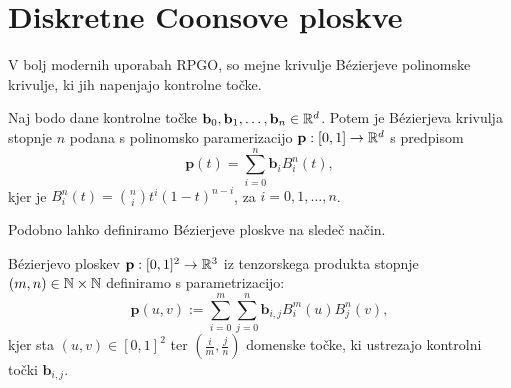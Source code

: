 \documentclass[a4paper,12pt]{article}
\begin{document}
\section{Diskretne Coonsove ploskve}
V bolj modernih uporabah RPGO, so mejne krivulje Bézierjeve polinomske krivulje, 
ki jih napenjajo kontrolne točke. 
\begin{definicija}
    Naj bodo dane kontrolne točke $\mathbf{b}_0, \mathbf{b}_1, \dots, \mathbf{b}_n \in \mathbb{R}^d$. 
    Potem je Bézierjeva krivulja stopnje $n$ podana s polinomsko paramerizacijo $\mathbf{p}: [0,1] \rightarrow \mathbb{R}^d$ s predpisom 
    $$\mathbf{p}(t) = \sum_{i=0}^n \mathbf{b}_{i} B_i^n(t),$$
    kjer je $B_i^n(t) = \binom{n}{i} t^i (1-t)^{n-i}$, za $i = 0, 1,\dots,n$. 
\end{definicija}

Podobno lahko definiramo Bézierjeve ploskve na sledeč način.

\begin{definicija}
    Bézierjevo ploskev $\mathbf{p} : [0,1]^2 \rightarrow \mathbb{R}^3$ iz tenzorskega produkta stopnje 
    $(m, n) \in \mathbb{N} \times \mathbb{N}$ definiramo s parametrizacijo:
    $$\mathbf{p}(u,v) := \sum_{i=0}^m \sum_{j=0}^n \mathbf{b}_{i,j} B_i^m(u)B_j^n(v),$$
    kjer sta $(u,v) \in [0,1]^2$ ter $(\frac{i}{m}, \frac{j}{n})$
    domenske točke, ki ustrezajo kontrolni točki $\mathbf{b}_{i,j}$.
\end{definicija}
\end{document}
